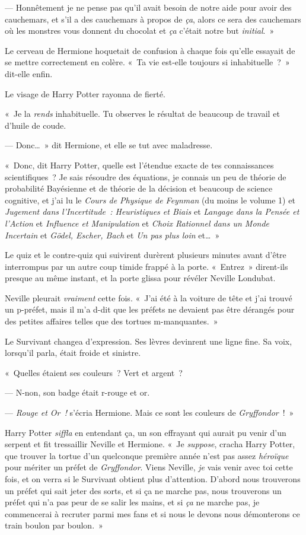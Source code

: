 --- Honnêtement je ne pense pas qu'il avait besoin de notre aide pour avoir des cauchemars, et s'il a des cauchemars à propos de \emph{ça}, alors ce sera des cauchemars où les monstres vous donnent du chocolat et \emph{ça} c'était notre but \emph{initial}.~»

Le cerveau de Hermione hoquetait de confusion à chaque fois qu'elle essayait de se mettre correctement en colère. «~Ta vie est-elle toujours si inhabituelle~?~» dit-elle enfin.

Le visage de Harry Potter rayonna de fierté.

«~Je la \emph{rends} inhabituelle. Tu observes le résultat de beaucoup de travail et d'huile de coude.

--- Donc…~» dit Hermione, et elle se tut avec maladresse.

«~Donc, dit Harry Potter, quelle est l'étendue exacte de tes connaissances scientifiques~? Je sais résoudre des équations, je connais un peu de théorie de probabilité Bayésienne et de théorie de la décision et beaucoup de science cognitive, et j'ai lu le \emph{Cours de Physique de Feynman} (du moins le volume 1) et \emph{Jugement dans l'Incertitude~: Heuristiques et Biais} et \emph{Langage dans la Pensée et l'Action} et \emph{Influence et Manipulation} et \emph{Choix Rationnel dans un Monde Incertain} et \emph{Gödel, Escher, Bach} et \emph{Un pas plus loin} et…~»

Le quiz et le contre-quiz qui suivirent durèrent plusieurs minutes avant d'être interrompus par un autre coup timide frappé à la porte. «~Entrez~» dirent-ils presque au même instant, et la porte glissa pour révéler Neville Londubat.

Neville pleurait \emph{vraiment} cette fois. «~J'ai été à la voiture de tête et j'ai trouvé un p-préfet, mais il m'a d-dit que les préfets ne devaient pas être dérangés pour des petites affaires telles que des tortues m-manquantes.~»

Le Survivant changea d'expression. Ses lèvres devinrent une ligne fine. Sa voix, lorsqu'il parla, était froide et sinistre.

«~Quelles étaient ses couleurs~? Vert et argent~?

--- N-non, son badge était r-rouge et or.

--- \emph{Rouge et Or~!} s'écria Hermione. Mais ce sont les couleurs de \emph{Gryffondor}~!~»

Harry Potter \emph{siffla} en entendant ça, un son effrayant qui aurait pu venir d'un serpent et fit tressaillir Neville et Hermione. «~Je \emph{suppose}, cracha Harry Potter, que trouver la tortue d'un quelconque première année n'est pas assez \emph{héroïque} pour mériter un préfet de \emph{Gryffondor}. Viens Neville, \emph{je} vais venir avec toi cette fois, et on verra si le Survivant obtient plus d'attention. D'abord nous trouverons un préfet qui sait jeter des sorts, et si ça ne marche pas, nous trouverons un préfet qui n'a pas peur de se salir les mains, et si \emph{ça} ne marche pas, je commencerai à recruter parmi mes fans et si nous le devons nous démonterons ce train boulon par boulon.~»

